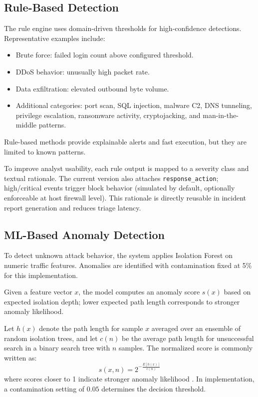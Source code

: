 \documentclass[conference]{IEEEtran}
\begin{document}
\subsection{Rule-Based Detection}
The rule engine uses domain-driven thresholds for high-confidence detections.
Representative examples include:
\begin{itemize}
    \item Brute force: failed login count above configured threshold.
    \item DDoS behavior: unusually high packet rate.
    \item Data exfiltration: elevated outbound byte volume.
    \item Additional categories: port scan, SQL injection, malware C2, DNS tunneling, privilege escalation, ransomware activity, cryptojacking, and man-in-the-middle patterns.
\end{itemize}

Rule-based methods provide explainable alerts and fast execution, but they are limited to known patterns.

To improve analyst usability, each rule output is mapped to a severity class and textual rationale. The current version also attaches \texttt{response\_action}; high/critical events trigger block behavior (simulated by default, optionally enforceable at host firewall level). This rationale is directly reusable in incident report generation and reduces triage latency.

\subsection{ML-Based Anomaly Detection}
To detect unknown attack behavior, the system applies Isolation Forest \cite{liu2008iforest} on numeric traffic features.
Anomalies are identified with contamination fixed at 5\% for this implementation.

Given a feature vector $x$, the model computes an anomaly score $s(x)$ based on expected isolation depth; lower expected path length corresponds to stronger anomaly likelihood.

Let $h(x)$ denote the path length for sample $x$ averaged over an ensemble of random isolation trees, and let $c(n)$ be the average path length for unsuccessful search in a binary search tree with $n$ samples. The normalized score is commonly written as:
\begin{equation}
s(x,n) = 2^{-\frac{E[h(x)]}{c(n)}}
\end{equation}
where scores closer to 1 indicate stronger anomaly likelihood \cite{liu2008iforest}. In implementation, a contamination setting of $0.05$ determines the decision threshold.
\end{document}
